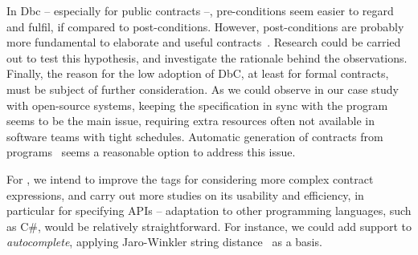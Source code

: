 In Dbc -- especially for public contracts --, pre-conditions seem easier to regard and fulfil, if compared to post-conditions. However, post-conditions are probably more fundamental to elaborate and useful contracts~\cite{Rosenblum}. Research could be carried out to test this hypothesis, and investigate the rationale behind the observations.   
Finally, the reason for the low adoption of DbC, at least for formal contracts, must be subject of further consideration. As we could observe in our case study with open-source systems, keeping the specification in sync with the program seems to be the main issue, requiring extra resources often not available in software teams with tight schedules. Automatic generation of contracts from programs~\cite{docAnalysis,atComment} seems a reasonable option to address this issue.  

For \contractjdoc{}, we intend to improve the tags for considering more complex contract expressions, and carry out more studies on its usability and efficiency, in particular for specifying APIs -- adaptation to other programming languages, such as C\#, would be relatively straightforward. 
For instance, we could add support to \emph{autocomplete}, applying Jaro-Winkler string distance~\cite{jaro,winkler99} as a basis.















